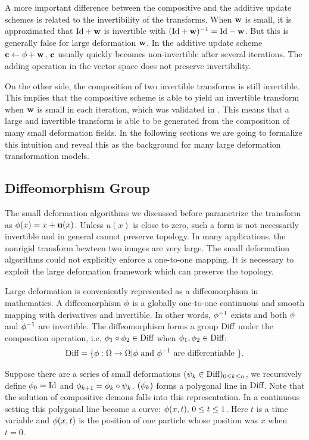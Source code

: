 \documentclass[letterpaper,12pt]{article}
\begin{document}
A more important difference between the compositive and the additive update schemes is related to the invertibility of the transforms. 
When $\mathbf{w}$ is small, it is approximated that $\text{Id}+\mathbf{w}$ is invertible
with $(\text{Id}+\mathbf{w})^{-1}=\text{Id}-\mathbf{w}$. But this is generally false for large deformation $\mathbf{w}$. 
In the additive update scheme $\mathbf{c} \leftarrow \phi + \mathbf{w}$, $\mathbf{c}$ usually quickly becomes non-invertible after several iterations. The adding operation in the vector space does not preserve invertibility. 

On the other side, the composition of two invertible transforms is still invertible. 
This implies that the compositive scheme is able to yield an invertible transform when $\mathbf{w}$ is small in each iteration, which was validated in \cite{Vercauteren2009}. 
This means that a large and invertible transform is able to be generated from the composition of many small deformation fields. In the following sections we are going to formalize this intuition and
reveal this as the background for many large deformation transformation models.

\subsection{Diffeomorphism Group}
\label{sec:diffgroup}

The small deformation algorithms we discussed before parametrize the
transform as $\phi(x) = x + \mathbf{u}(x)$. Unless $u(x)$ is close to
zero, such a form is not necessarily invertible and in general cannot
preserve topology. In many applications, the nonrigid transform bewteen two images are very large. The small deformation algorithms could not explicitly enforce a one-to-one mapping. It is necessary to exploit the large deformation framework which can preserve the topology.

Large deformation is conveniently represented as a diffeomorphism in mathematics. A diffeomorphism $\phi$ is a globally one-to-one continuous and smooth mapping with derivatives and invertible. In other words, $\phi^{-1}$ exists and both $\phi$ and $\phi^{-1}$ are invertible. The diffeomorphism forms a group $\text{Diff}$ under the composition operation, i.e. $\phi_1 \circ \phi_2 \in \text{Diff}$ when $\phi_1, \phi_2 \in \text{Diff}$:
\begin{align}
\text{Diff} = \{ \phi: \Omega \to \Omega | \phi \text{ and } \phi^{-1} \text{ are differentiable }\}.
\end{align}

Suppose there are a series of small deformations $(\psi_k \in \text{Diff})_{0 \leq k \leq n}$, we recursively define $\phi_0 = \text{Id}$ and $\phi_{k+1} = \phi_{k} \circ \psi_{k}$.  $(\phi_{k})$ forms a polygonal line in $\text{Diff}$. Note that the solution of compositive demons falls into this representation. In a continuous setting this polygonal line become a curve: $\phi(x, t), \, 0 \leq t \leq 1$. Here $t$ is a time variable and $\phi(x, t)$ is the position of one particle whose position was $x$ when $t=0$.
\end{document}

